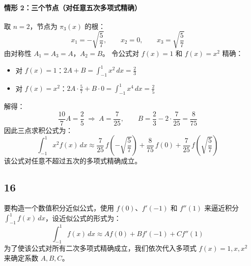\documentclass{article}
\begin{document}
\paragraph{情形 2：三个节点（对任意五次多项式精确）}

取 \(n=2\)，节点为 \(\pi_3(x)\) 的根：
\[
x_1 = -\sqrt{\frac{5}{7}}, \qquad x_2 = 0, \qquad x_3 = \sqrt{\frac{5}{7}}
\]
由对称性 \(A_1 = A_3 = A\)，\(A_2 = B\)。  
令公式对 \(f(x)=1\) 和 \(f(x)=x^2\) 精确：

\begin{itemize}
    \item 对 \(f(x)=1\)：\(\displaystyle 2A + B = \int_{-1}^{1} x^2\,dx = \frac{2}{3}\)
    \item 对 \(f(x)=x^2\)：\(\displaystyle 2A \cdot \frac{5}{7} + B \cdot 0 = \int_{-1}^{1} x^4\,dx = \frac{2}{5}\)
\end{itemize}

解得：
\[
\frac{10}{7}A = \frac{2}{5} \;\Rightarrow\; A = \frac{7}{25}, \qquad
B = \frac{2}{3} - 2\cdot\frac{7}{25} = \frac{8}{75}
\]
因此三点求积公式为：
\[
\boxed{\int_{-1}^{1} x^2 f(x)\,dx \approx \frac{7}{25}\,f\!\left(-\sqrt{\frac{5}{7}}\right) + \frac{8}{75}\,f(0) + \frac{7}{25}\,f\!\left(\sqrt{\frac{5}{7}}\right)}
\]
该公式对任意不超过五次的多项式精确成立。

\subsection*{16}

要构造一个数值积分近似公式，使用 \( f(0) \)、\( f'(-1) \) 和 \( f''(1) \) 来逼近积分 \( \int_{-1}^1 f(x)\,dx \)，设近似公式的形式为：
\[
\int_{-1}^1 f(x)\,dx \approx A f(0) + B f'(-1) + C f''(1)
\]
为了使该公式对所有二次多项式精确成立，我们依次代入多项式 \( f(x) = 1, x, x^2 \) 来确定系数 \( A, B, C \)。
\end{document}
